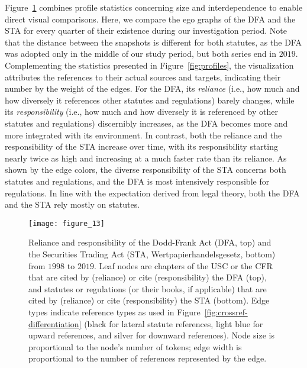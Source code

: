 Figure~\ref{fig:profile-graphs} combines profile statistics concerning size and interdependence to enable direct visual comparisons. 
Here, we compare the ego graphs of the DFA and the STA for every quarter of their existence during our investigation period.
Note that the distance between the snapshots is different for both statutes, 
as the DFA was adopted only in the middle of our study period, but both series end in $2019$.
Complementing the statistics presented in Figure~\ref{fig:profiles}, the visualization attributes the references to their actual sources and targets, indicating their number by the weight of the edges.
For the DFA, its \emph{reliance} (i.e., how much and how diversely it references other statutes and regulations) barely changes,
while its \emph{responsibility} (i.e., how much and how diversely it is referenced by other statutes and regulations) discernibly increases, 
as the DFA becomes more and more integrated with its environment.
In contrast, both the reliance and the responsibility of the STA increase over time, with its responsibility starting nearly twice as high and increasing at a much faster rate than its reliance.
As shown by the edge colors, the diverse responsibility of the STA concerns both statutes and regulations,
and the DFA is most intensively responsible for regulations.
In line with the expectation derived from legal theory,
both the DFA and the STA rely mostly on statutes.

\begin{figure} 
	\centering
	\vspace*{-8pt}\texttt{[image: figure\_13]}
	\caption{Reliance and responsibility of the Dodd-Frank Act (DFA, top) and the Securities Trading Act (STA, Wertpapierhandelsgesetz, bottom) from $1998$ to $2019$.
	Leaf nodes are chapters of the USC or the CFR that are cited by (reliance) or cite (responsibility) the DFA (top), 
	and statutes or regulations (or their books, if applicable) that are cited by (reliance) or cite (responsibility) the STA (bottom).
	Edge types indicate reference types as used in Figure~\ref{fig:crossref-differentiation} (black for lateral statute references, light blue for upward references, and silver for downward references).
	Node size is proportional to the node's number of tokens;
	edge width is proportional to the number of references represented by the edge.
	}\label{fig:profile-graphs}
\end{figure}
